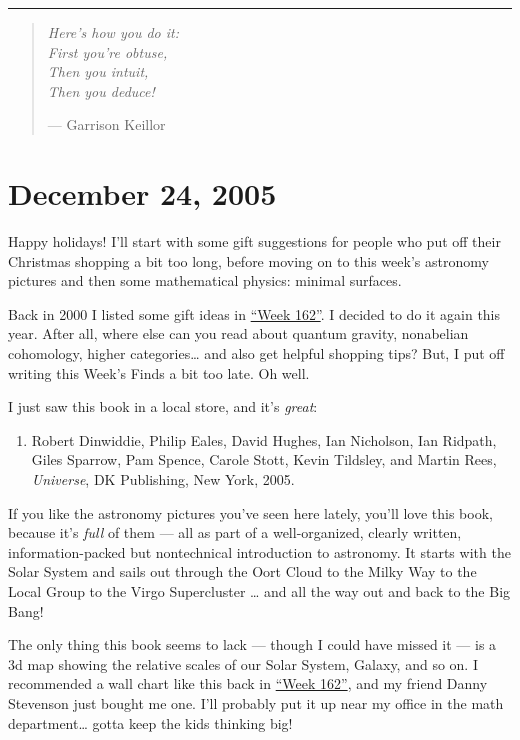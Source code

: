 \documentclass{article}
\def\tightlist{}
\begin{document}
\begin{center}\rule{0.5\linewidth}{0.5pt}\end{center}

\begin{quote}
\emph{Here's how you do it:\\
First you're obtuse,\\
Then you intuit,\\
Then you deduce!}

--- Garrison Keillor
\end{quote}



\hypertarget{week225}{%
\section{December 24, 2005}\label{week225}}

Happy holidays! I'll start with some gift suggestions for people who put
off their Christmas shopping a bit too long, before moving on to this
week's astronomy pictures and then some mathematical physics: minimal
surfaces.

Back in 2000 I listed some gift ideas in
\protect\hyperlink{week162}{``Week 162''}. I decided to do it again this
year. After all, where else can you read about quantum gravity,
nonabelian cohomology, higher categories\ldots{} and also get helpful
shopping tips? But, I put off writing this Week's Finds a bit too late.
Oh well.

I just saw this book in a local store, and it's \emph{great}:

\begin{enumerate}
\def\labelenumi{\arabic{enumi})}
\tightlist
\item
  Robert Dinwiddie, Philip Eales, David Hughes, Ian Nicholson, Ian
  Ridpath, Giles Sparrow, Pam Spence, Carole Stott, Kevin Tildsley, and
  Martin Rees, \emph{Universe}, DK Publishing, New York, 2005.
\end{enumerate}

If you like the astronomy pictures you've seen here lately, you'll love
this book, because it's \emph{full} of them --- all as part of a
well-organized, clearly written, information-packed but nontechnical
introduction to astronomy. It starts with the Solar System and sails out
through the Oort Cloud to the Milky Way to the Local Group to the Virgo
Supercluster \ldots{} and all the way out and back to the Big Bang!

The only thing this book seems to lack --- though I could have missed it
--- is a 3d map showing the relative scales of our Solar System, Galaxy,
and so on. I recommended a wall chart like this back in
\protect\hyperlink{week162}{``Week 162''}, and my friend Danny Stevenson
just bought me one. I'll probably put it up near my office in the math
department\ldots{} gotta keep the kids thinking big!
\end{document}
